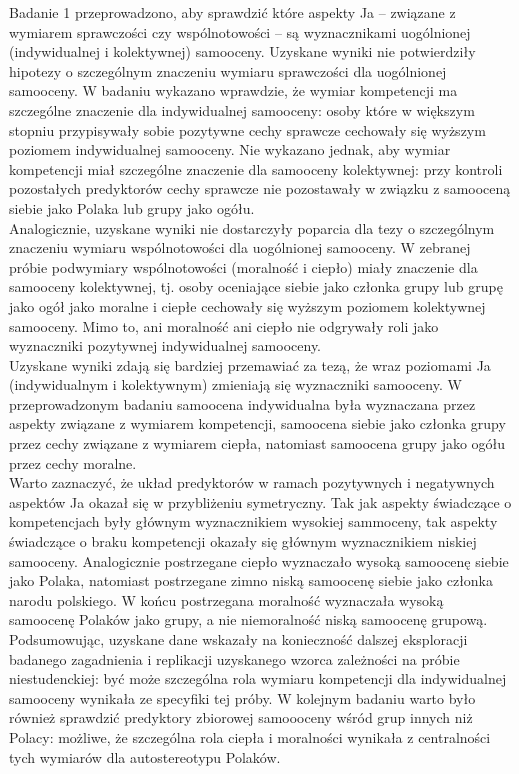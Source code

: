\documentclass[man]{apa6}
\begin{document}
Badanie 1 przeprowadzono, aby sprawdzić które aspekty Ja -- związane z wymiarem sprawczości czy wspólnotowości -- są wyznacznikami uogólnionej (indywidualnej i kolektywnej) samooceny. Uzyskane wyniki nie potwierdziły hipotezy o szczególnym znaczeniu wymiaru sprawczości dla uogólnionej samooceny. W badaniu wykazano wprawdzie, że wymiar kompetencji ma szczególne znaczenie dla indywidualnej samooceny: osoby które w większym stopniu przypisywały sobie pozytywne cechy sprawcze cechowały się wyższym poziomem indywidualnej samooceny. Nie wykazano jednak, aby wymiar kompetencji miał szczególne znaczenie dla samooceny kolektywnej: przy kontroli pozostałych predyktorów cechy sprawcze nie pozostawały w związku z samooceną siebie jako Polaka lub grupy jako ogółu. \\
Analogicznie, uzyskane wyniki nie dostarczyły poparcia dla tezy o szczególnym znaczeniu wymiaru wspólnotowości dla uogólnionej samooceny. W zebranej próbie podwymiary wspólnotowości (moralność i ciepło) miały znaczenie dla samooceny kolektywnej, tj. osoby oceniające siebie jako członka grupy lub grupę jako ogół jako moralne i ciepłe cechowały się wyższym poziomem kolektywnej samooceny. Mimo to, ani moralność ani ciepło nie odgrywały roli jako wyznaczniki pozytywnej indywidualnej samooceny.\\
Uzyskane wyniki zdają się bardziej przemawiać za tezą, że wraz poziomami Ja (indywidualnym i kolektywnym) zmieniają się wyznaczniki samooceny. W przeprowadzonym badaniu samoocena indywidualna była wyznaczana przez aspekty związane z wymiarem kompetencji, samoocena siebie jako członka grupy przez cechy związane z wymiarem ciepła, natomiast samoocena grupy jako ogółu przez cechy moralne. \\
Warto zaznaczyć, że układ predyktorów w ramach pozytywnych i negatywnych aspektów Ja okazał się w przybliżeniu symetryczny. Tak jak aspekty świadczące o kompetencjach były głównym wyznacznikiem wysokiej sammoceny, tak aspekty świadczące o braku kompetencji okazały się głównym wyznacznikiem niskiej samooceny. Analogicznie postrzegane ciepło wyznaczało wysoką samoocenę siebie jako Polaka, natomiast postrzegane zimno niską samoocenę siebie jako członka narodu polskiego. W końcu postrzegana moralność wyznaczała wysoką samoocenę Polaków jako grupy, a nie niemoralność niską samoocenę grupową. \\
Podsumowując, uzyskane dane wskazały na konieczność dalszej eksploracji badanego zagadnienia i replikacji uzyskanego wzorca zależności na próbie niestudenckiej: być może szczególna rola wymiaru kompetencji dla indywidualnej samooceny wynikała ze specyfiki tej próby. W kolejnym badaniu warto było również sprawdzić predyktory zbiorowej samoooceny wśród grup innych niż Polacy: możliwe, że szczególna rola ciepła i moralności wynikała z centralności tych wymiarów dla autostereotypu Polaków. \\
\end{document}
